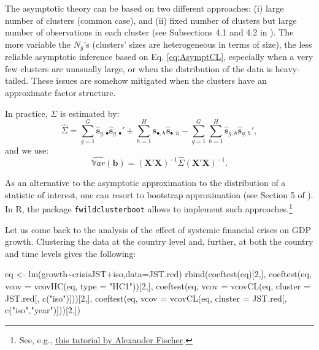 \documentclass[
  12pt,
]{book}
\newenvironment{Shaded}{\begin{snugshade}}{\end{snugshade}}
\newcommand{\AttributeTok}[1]{\textcolor[rgb]{0.77,0.63,0.00}{#1}}
\newcommand{\DecValTok}[1]{\textcolor[rgb]{0.00,0.00,0.81}{#1}}
\newcommand{\FunctionTok}[1]{\textcolor[rgb]{0.00,0.00,0.00}{#1}}
\newcommand{\NormalTok}[1]{#1}
\newcommand{\OtherTok}[1]{\textcolor[rgb]{0.56,0.35,0.01}{#1}}
\newcommand{\SpecialCharTok}[1]{\textcolor[rgb]{0.00,0.00,0.00}{#1}}
\newcommand{\StringTok}[1]{\textcolor[rgb]{0.31,0.60,0.02}{#1}}
\theoremstyle{definition}
\theoremstyle{definition}
\theoremstyle{definition}
\theoremstyle{definition}
\theoremstyle{remark}
\begin{document}
The asymptotic theory can be based on two different approaches: (i) large number of clusters (common case), and (ii) fixed number of clusters but large number of observations in each cluster (see Subsections 4.1 and 4.2 in \citet{MACKINNON2022}). The more variable the \(N_g\)'s (clusters' sizes are heterogeneous in terms of size), the less reliable asymptotic inference based on Eq. \eqref{eq:AsymptCL}, especially when a very few clusters are unusually large, or when the distribution of the data is heavy-tailed. These issues are somehow mitigated when the clusters have an approximate factor structure.

In practice, \(\Sigma\) is estimated by:
\[
\widehat{\Sigma} = \sum_{g=1}^G \widehat{\mathbf{s}}_{g,\bullet}\widehat{\mathbf{s}}_{g,\bullet}' + \sum_{h=1}^H \widehat{\mathbf{s}}_{\bullet,h}\widehat{\mathbf{s}}_{\bullet,h} - \sum_{g=1}^G\sum_{h=1}^H \widehat{\mathbf{s}}_{g,h}\widehat{\mathbf{s}}_{g,h}',
\]
and we use:
\[
\widehat{\mathbb{V}ar}(\mathbf{b}) = \left(\mathbf{X}'\mathbf{X}\right)^{-1}\widehat{\Sigma}\left(\mathbf{X}'\mathbf{X}\right)^{-1}.
\]

As an alternative to the asymptotic approximation to the distribution of a statistic of interest, one can resort to bootstrap approximation (see Section 5 of \citet{MACKINNON2022}). In R, the package \texttt{fwildclusterboot} allows to implement such approaches.\footnote{See, e.g., \href{https://cran.r-project.org/web/packages/fwildclusterboot/vignettes/fwildclusterboot.html}{this tutorial by Alexander Fischer}.}

Let us come back to the analysis of the effect of systemic financial crises on GDP growth. Clustering the data at the country level and, further, at both the country and time levels gives the following:

\begin{Shaded}
\begin{Highlighting}[]
\NormalTok{eq }\OtherTok{\textless{}{-}} \FunctionTok{lm}\NormalTok{(growth}\SpecialCharTok{\textasciitilde{}}\NormalTok{crisisJST}\SpecialCharTok{+}\NormalTok{iso,}\AttributeTok{data=}\NormalTok{JST.red)}
\FunctionTok{rbind}\NormalTok{(}\FunctionTok{coeftest}\NormalTok{(eq)[}\DecValTok{2}\NormalTok{,],}
      \FunctionTok{coeftest}\NormalTok{(eq, }\AttributeTok{vcov =} \FunctionTok{vcovHC}\NormalTok{(eq, }\AttributeTok{type =} \StringTok{"HC1"}\NormalTok{))[}\DecValTok{2}\NormalTok{,],}
      \FunctionTok{coeftest}\NormalTok{(eq, }\AttributeTok{vcov =} \FunctionTok{vcovCL}\NormalTok{(eq, }\AttributeTok{cluster =}\NormalTok{ JST.red[, }\FunctionTok{c}\NormalTok{(}\StringTok{"iso"}\NormalTok{)]))[}\DecValTok{2}\NormalTok{,],}
      \FunctionTok{coeftest}\NormalTok{(eq, }\AttributeTok{vcov =} \FunctionTok{vcovCL}\NormalTok{(eq, }\AttributeTok{cluster =}\NormalTok{ JST.red[, }\FunctionTok{c}\NormalTok{(}\StringTok{"iso"}\NormalTok{,}\StringTok{"year"}\NormalTok{)]))[}\DecValTok{2}\NormalTok{,])}
\end{Highlighting}
\end{Shaded}
\end{document}
